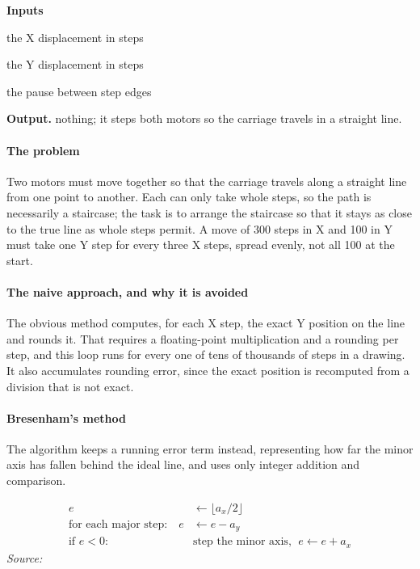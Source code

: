 \noindent\textbf{Inputs}
\begin{description}[leftmargin=2.2em,style=nextline,font=\normalfont\ttfamily]\setlength\itemsep{1pt}
  \item[{dx}] \normalfont the X displacement in steps
  \item[{dy}] \normalfont the Y displacement in steps
  \item[{stepDelayS}] \normalfont the pause between step edges
\end{description}

\noindent\textbf{Output.} nothing; it steps both motors so the carriage travels in a straight line.


\paragraph{The problem}
Two motors must move together so that the carriage travels along a straight line from one point to another. Each can only take whole steps, so the path is necessarily a staircase; the task is to arrange the staircase so that it stays as close to the true line as whole steps permit. A move of 300 steps in X and 100 in Y must take one Y step for every three X steps, spread evenly, not all 100 at the start.


\paragraph{The naive approach, and why it is avoided}
The obvious method computes, for each X step, the exact Y position on the line and rounds it. That requires a floating-point multiplication and a rounding per step, and this loop runs for every one of tens of thousands of steps in a drawing. It also accumulates rounding error, since the exact position is recomputed from a division that is not exact.


\paragraph{Bresenham's method}
The algorithm \cite{bresenham1965} keeps a running error term instead, representing how far the minor axis has fallen behind the ideal line, and uses only integer addition and comparison.


\begin{equation}
\begin{aligned} e &\leftarrow \lfloor a_x / 2 \rfloor \\[3pt] \text{for each major step:} \quad e &\leftarrow e - a_y \\[3pt] \text{if } e < 0: \quad &\text{step the minor axis, } \; e \leftarrow e + a_x \end{aligned}
\end{equation}
\noindent\emph{Source: }\cite{bresenham1965}


